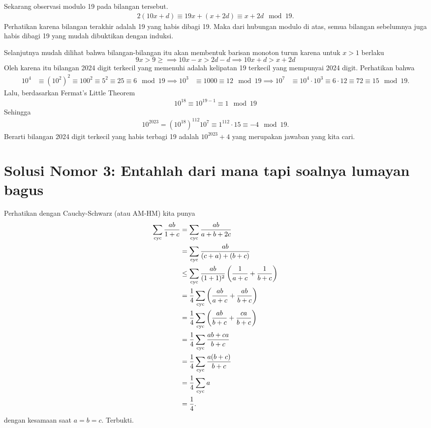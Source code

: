 \documentclass[a4paper, 12pt]{scrartcl}
\begin{document}
    Sekarang observasi modulo 19 pada bilangan tersebut.
    \begin{align*}
        2(10x+d) \equiv 19x + (x+2d) \equiv x+2d \mod 19.
    \end{align*}
    Perhatikan karena bilangan terakhir adalah 19 yang habis dibagi 19. Maka dari hubungan modulo di atas, semua bilangan sebelumnya juga habis dibagi 19 yang mudah dibuktikan dengan induksi.

    Selanjutnya mudah dilihat bahwa bilangan-bilangan itu akan membentuk barisan monoton turun karena untuk $x>1$ berlaku
    $$9x > 9 \ge \implies 10x-x > 2d - d \implies 10x+d > x+2d$$
    Oleh karena itu bilangan 2024 digit terkecil yang memenuhi adalah kelipatan 19 terkecil yang mempunyai 2024 digit. Perhatikan bahwa
    \begin{align*}
        10^4 &\equiv (10^2)^2 \equiv 100^2 \equiv 5^2 \equiv 25 \equiv 6 \mod 19
        \implies 10^3 &\equiv 1000 \equiv 12 \mod 19
        \implies 10^7 &\equiv 10^4\cdot 10^3 \equiv 6 \cdot 12 \equiv 72 \equiv 15 \mod 19.
    \end{align*}
    Lalu, berdasarkan Fermat's Little Theorem
    \begin{align*}
        10^{18} \equiv 10^{19-1} \equiv 1 \mod 19
    \end{align*}
    Sehingga
    \begin{align*}
        10^{2023} = (10^{18})^{112}10^7 \equiv 1^{112} \cdot 15 \equiv -4 \mod 19.
    \end{align*}
    Berarti bilangan 2024 digit terkecil yang habis terbagi 19 adalah $10^{2023} + 4$ yang merupakan jawaban yang kita cari.

\section{Solusi Nomor 3: Entahlah dari mana tapi soalnya lumayan bagus}
    Perhatikan dengan Cauchy-Schwarz (atau AM-HM) kita punya
    \begin{align*}
        \sum_{\mathrm{cyc}} \dfrac{ab}{1+c} &= \sum_{\mathrm{cyc}} \dfrac{ab}{a+b+2c}\\
        &= \sum_{\mathrm{cyc}} \dfrac{ab}{(c+a)+(b+c)}\\
        &\le \sum_{\mathrm{cyc}} \dfrac{ab}{(1+1)^2}\left(\dfrac{1}{a+c} + \dfrac{1}{b+c}\right)\\
        &= \dfrac{1}{4} \sum_{\mathrm{cyc}} \left(\dfrac{ab}{a+c} + \dfrac{ab}{b+c}\right)\\
        &= \dfrac{1}{4}\sum_{\mathrm{cyc}} \left(\dfrac{ab}{b+c}+\dfrac{ca}{b+c}\right)\\
        &= \dfrac{1}{4}\sum_{\mathrm{cyc}} \dfrac{ab+ca}{b+c}\\
        &= \dfrac{1}{4}\sum_{\mathrm{cyc}} \dfrac{a(b+c)}{b+c}\\
        &= \dfrac{1}{4}\sum_{\mathrm{cyc}} a\\
        &= \dfrac{1}{4}.
    \end{align*}
    dengan kesamaan saat $a=b=c$. Terbukti.
\end{document}
